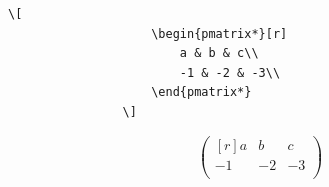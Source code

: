 \documentclass[handout,hyperref={colorlinks=true}]{beamer}
\theoremstyle{remark}
\newcommand{\vaihto}{\\ \vspace{10pt}}
\begin{document}
\begin{frame}[fragile]
    \begin{minipage}{4cm}
        \begin{scriptsize}
            \begin{Verbatim}[frame=single]
                \[
                    \begin{pmatrix*}[r]
                        a & b & c\\
                        -1 & -2 & -3\\
                    \end{pmatrix*}
                \]
            \end{Verbatim}
        \end{scriptsize}
    \end{minipage}
    \begin{minipage}{4cm}
        \[
            \begin{pmatrix*}[r]
                a & b & c\\
                -1 & -2 & -3\\
            \end{pmatrix*}
        \]
    \end{minipage}
\end{frame}
\end{document}
